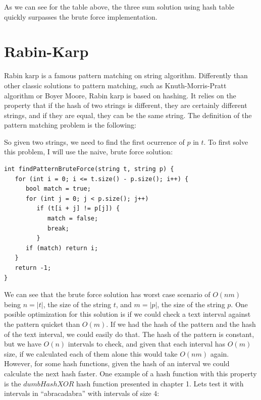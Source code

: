 \bigskip

As we can see for the table above, the three sum solution using hash table quickly surpasses the brute force implementation.

\section{Rabin-Karp}

Rabin karp is a famous pattern matching on string algorithm. Differently than other classic solutions to pattern matching, such as Knuth-Morris-Pratt algorithm or Boyer Moore, Rabin karp is based on hashing. It relies on the property that if the hash of two strings is different, they are certainly different strings, and if they are equal, they can be the same string. The definition of the pattern matching problem is the following:

\medskip


\medskip

So given two strings, we need to find the first ocurrence of \( p \) in \( t \). To first solve this problem, I will use the naive, brute force solution:

\begin{lstlisting}
int findPatternBruteForce(string t, string p) {
   for (int i = 0; i <= t.size() - p.size(); i++) {
      bool match = true;
      for (int j = 0; j < p.size(); j++)
         if (t[i + j] != p[j]) {
            match = false;
            break;
         }
      if (match) return i;
   }
   return -1;
}
\end{lstlisting}

We can see that the brute force solution has worst case scenario of \( O(nm) \) being \( n = |t| \), the size of the string \( t \), and \( m = |p| \), the size of the string \( p \). One posible optimization for this solution is if we could check a text interval against the pattern quicket than \( O(m) \). If we had the hash of the pattern and the hash of the text interval, we could easily do that. The hash of the pattern is constant, but we have \( O(n) \) intervals to check, and given that each interval has \( O(m) \) size, if we calculated each of them alone this would take \( O(nm) \) again. However, for some hash functions, given the hash of an interval we could calculate the next hash faster. One example of a hash function with this property is the \( dumbHashXOR \) hash function presented in chapter 1. Lets test it with intervals in ``abracadabra'' with intervals of size 4:


